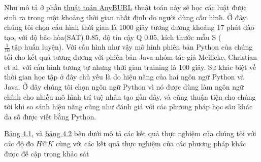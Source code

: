 Như mô tả ở phần \hyperref[algorithm2]{thuật toán AnyBURL} thuật toán này sẽ học các luật được sinh ra trong một khoảng thời gian nhất định do người dùng cấu hình. Ở đây chúng tôi chọn cấu hình thời gian là 1000 giây tương đương khoảng 17 phút đào tạo, với độ bão hòa(SAT) \(0.85\), độ tin cậy Q \(0.05\), kích thước mẫu S (\(\frac{1}{10}~ \text{tập huấn luyện}\)). Với cấu hình như vậy mô hình phiên bản Python của chúng tối cho kết quả tương đương với phiên bản Java nhóm tác giả Meilicke, Christian et al. \cite{burl} với cấu hình tương tự nhưng thời gian training là 100 giây. Sự khác biệt về thời gian học tập ở đây chủ yếu là do hiệu năng của hai ngôn ngữ Python và Java. Ở đây chúng tôi chọn ngôn ngữ Python vì nó được dùng làm ngôn ngữ chính cho nhiều mô hình trí tuệ nhân tạo gần đây, và cũng thuận tiện cho chúng tôi khi so sánh hiệu năng cũng như đánh giá với các phương pháp học sâu khác da số được viết bằng Python.

\hyperref[tab:tab1]{Bảng 4.1}, và \hyperref[tab:tab2]{bảng 4.2} bên dưới mô tả các kết quả thực nghiệm của chúng tôi với các độ đo \(H@K\) cùng với các kết quả thực nghiệm của các phương pháp khác được đề cập trong khảo  sát \cite{rossi2020knowledge}


